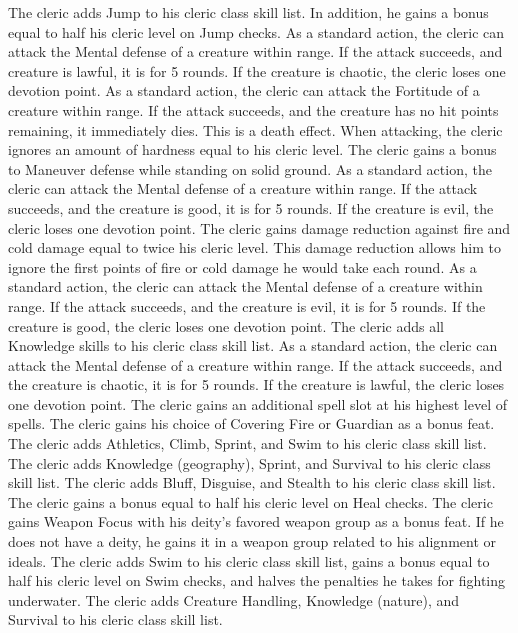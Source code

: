 The cleric adds Jump to his cleric class skill list.
In addition, he gains a bonus equal to half his cleric level on Jump checks.
As a standard action, the cleric can attack the Mental defense of a creature within \rngclose range.
If the attack succeeds, and creature is lawful, it is \disoriented for 5 rounds.
If the creature is chaotic, the cleric loses one devotion point.
\norepeatnotes
{}
As a standard action, the cleric can attack the Fortitude of a creature within \rngclose range.
If the attack succeeds, and the creature has no hit points remaining, it immediately dies.
This is a death effect.
When attacking, the cleric ignores an amount of hardness equal to his cleric level.
The cleric gains a  bonus to Maneuver defense while standing on solid ground.
As a standard action, the cleric can attack the Mental defense of a creature within \rngclose range.
If the attack succeeds, and the creature is good, it is \staggered for 5 rounds.
If the creature is evil, the cleric loses one devotion point.
\norepeatnotes
{}
The cleric gains damage reduction against fire and cold damage equal to twice his cleric level.
This damage reduction allows him to ignore the first points of fire or cold damage he would take each round.
As a standard action, the cleric can attack the Mental defense of a creature within \rngclose range.
If the attack succeeds, and the creature is evil, it is \dazed for 5 rounds.
If the creature is good, the cleric loses one devotion point.
\norepeatnotes
{}
The cleric adds all Knowledge skills to his cleric class skill list.
As a standard action, the cleric can attack the Mental defense of a creature within \rngclose range.
If the attack succeeds, and the creature is chaotic, it is \staggered for 5 rounds.
If the creature is lawful, the cleric loses one devotion point.
\norepeatnotes
{}
The cleric gains an additional spell slot at his highest level of spells.
The cleric gains his choice of Covering Fire or Guardian as a bonus feat.
The cleric adds Athletics, Climb, Sprint, and Swim to his cleric class skill list.
The cleric adds Knowledge (geography), Sprint, and Survival to his cleric class skill list.
The cleric adds Bluff, Disguise, and Stealth to his cleric class skill list.
The cleric gains a bonus equal to half his cleric level on Heal checks.
The cleric gains Weapon Focus with his deity's favored weapon group as a bonus feat.
If he does not have a deity, he gains it in a weapon group related to his alignment or ideals.
The cleric adds Swim to his cleric class skill list, gains a bonus equal to half his cleric level on Swim checks, and halves the penalties he takes for fighting underwater.
The cleric adds Creature Handling, Knowledge (nature), and Survival to his cleric class skill list.

